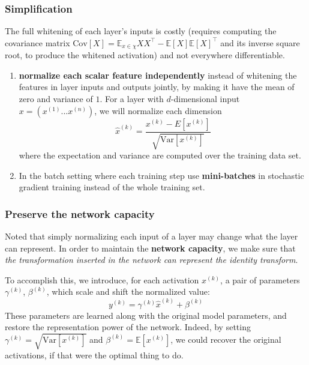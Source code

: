 \documentclass[a4paper, 12pt]{book} %
\begin{document}
\subsubsection{Simplification}  
The full whitening of each layer's inputs is costly (requires computing the covariance matrix $\mathrm{Cov}[X]=\mathbb{E}_{x\in \chi}{XX^\top}-\mathbb{E}{[X]}\mathbb{E}{[X]}^\top$ and its inverse square root, to produce the whitened activation) and not everywhere differentiable.
\begin{enumerate}
	\item \textbf{normalize each scalar feature independently} instead of whitening the features in layer inputs and outputs jointly, by making it have the mean of zero and variance of $1$. For a layer with $d$-dimensional input $x=(x^{(1)}...x^{(n)})$, we will normalize each dimension 
	$$\hat{x}^{(k)}=\frac{x^{(k)}-E{[x^{(k)}]}}{\sqrt{\mathrm{Var}{[x^{(k)}]}}}$$ where the expectation and variance are computed over the training data set.
	
	
	\item In the batch setting where each training step use \textbf{mini-batches} in stochastic gradient training instead of the whole training set.
\end{enumerate}

\subsubsection{Preserve the network capacity}
Noted that simply normalizing each input of a layer may change what the layer can represent. In order to maintain the \textbf{network capacity}, we make sure that \emph{the transformation inserted in the network can represent the identity transform}.

To accomplish this, we introduce, for each activation $x^{(k)}$, a pair of parameters $\gamma^{(k)}$, $\beta^{(k)}$, which scale and shift the normalized value:
$$y^{(k)}=\gamma^{(k)}\hat{x}^{(k)}+\beta^{(k)}$$
These parameters are learned along with the original
model parameters, and restore the representation power
of the network. Indeed, by setting $\gamma^{(k)} = \sqrt{\mathrm{Var}{[x^{(k)}]}}$ and
$\beta^{(k)} = \mathbb{E}[x^{(k)}]$, we could recover the original activations,
if that were the optimal thing to do.
\end{document}
